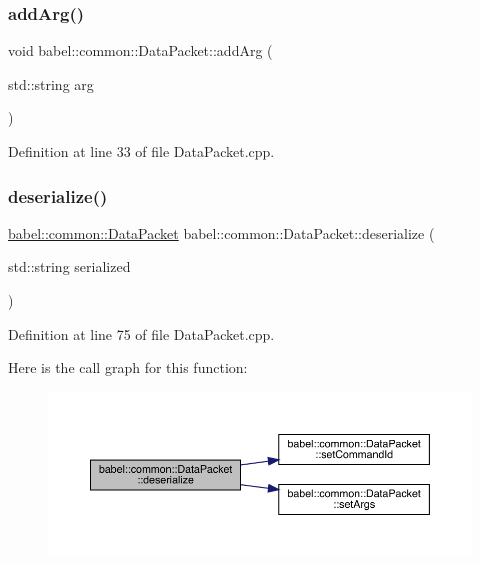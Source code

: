 \subsubsection{\texorpdfstring{add\+Arg()}{addArg()}}
{\footnotesize\ttfamily void babel\+::common\+::\+Data\+Packet\+::add\+Arg (\begin{DoxyParamCaption}\item[{std\+::string}]{arg }\end{DoxyParamCaption})}



Definition at line 33 of file Data\+Packet.\+cpp.

\mbox{\label{classbabel_1_1common_1_1_data_packet_aeb93b2fb7ceaa5d78409808796a895f4}} 
\subsubsection{\texorpdfstring{deserialize()}{deserialize()}}
{\footnotesize\ttfamily \mbox{\hyperlink{classbabel_1_1common_1_1_data_packet}{babel\+::common\+::\+Data\+Packet}} babel\+::common\+::\+Data\+Packet\+::deserialize (\begin{DoxyParamCaption}\item[{std\+::string}]{serialized }\end{DoxyParamCaption})\hspace{0.3cm}{\ttfamily [static]}}



Definition at line 75 of file Data\+Packet.\+cpp.

Here is the call graph for this function\+:\nopagebreak
\begin{figure}[H]
\begin{center}
\leavevmode
\includegraphics[width=350pt]{classbabel_1_1common_1_1_data_packet_aeb93b2fb7ceaa5d78409808796a895f4_cgraph}
\end{center}
\end{figure}
\mbox{\label{classbabel_1_1common_1_1_data_packet_a9b5191cfb79290db7eea1a9b9aff3936}} 
